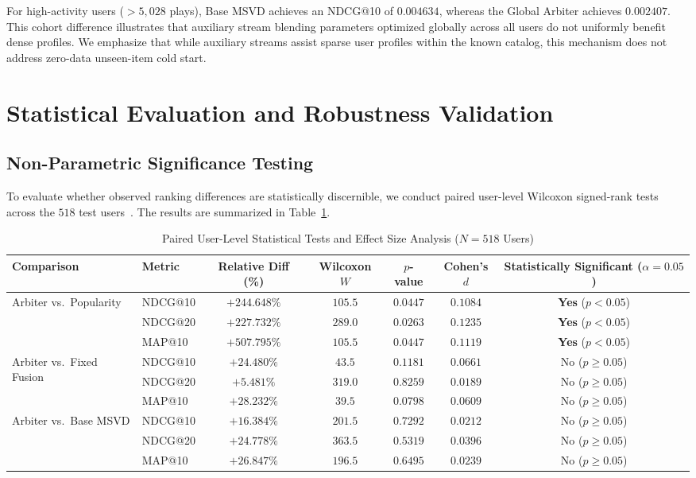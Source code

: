 \documentclass[conference]{IEEEtran}
\begin{document}
For high-activity users ($>5,028$ plays), Base MSVD achieves an NDCG@10 of $0.004634$, whereas the Global Arbiter achieves $0.002407$. This cohort difference illustrates that auxiliary stream blending parameters optimized globally across all users do not uniformly benefit dense profiles. We emphasize that while auxiliary streams assist sparse user profiles within the known catalog, this mechanism does not address zero-data unseen-item cold start.

\section{Statistical Evaluation and Robustness Validation}

\subsection{Non-Parametric Significance Testing}
To evaluate whether observed ranking differences are statistically discernible, we conduct paired user-level Wilcoxon signed-rank tests across the $518$ test users~\cite{wilcoxon1945individual}. The results are summarized in Table~\ref{tab:significance}.

\begin{table}[t]
\caption{Paired User-Level Statistical Tests and Effect Size Analysis ($N = 518$ Users)}
\label{tab:significance}
\centering
\begin{tabular}{llccccc}
\toprule
\textbf{Comparison} & \textbf{Metric} & \textbf{Relative Diff (\%)} & \textbf{Wilcoxon $W$} & \textbf{$p$-value} & \textbf{Cohen's $d$} & \textbf{Statistically Significant ($\alpha=0.05$)} \\
\midrule
\multirow{3}{*}{Arbiter vs.\ Popularity} & NDCG@10 & $+244.648\%$ & $105.5$ & $\mathbf{0.0447}$ & $0.1084$ & \textbf{Yes} ($p < 0.05$) \\
& NDCG@20 & $+227.732\%$ & $289.0$ & $\mathbf{0.0263}$ & $0.1235$ & \textbf{Yes} ($p < 0.05$) \\
& MAP@10 & $+507.795\%$ & $105.5$ & $\mathbf{0.0447}$ & $0.1119$ & \textbf{Yes} ($p < 0.05$) \\
\midrule
\multirow{3}{*}{Arbiter vs.\ Fixed Fusion} & NDCG@10 & $+24.480\%$ & $43.5$ & $0.1181$ & $0.0661$ & No ($p \ge 0.05$) \\
& NDCG@20 & $+5.481\%$ & $319.0$ & $0.8259$ & $0.0189$ & No ($p \ge 0.05$) \\
& MAP@10 & $+28.232\%$ & $39.5$ & $0.0798$ & $0.0609$ & No ($p \ge 0.05$) \\
\midrule
\multirow{3}{*}{Arbiter vs.\ Base MSVD} & NDCG@10 & $+16.384\%$ & $201.5$ & $0.7292$ & $0.0212$ & No ($p \ge 0.05$) \\
& NDCG@20 & $+24.778\%$ & $363.5$ & $0.5319$ & $0.0396$ & No ($p \ge 0.05$) \\
& MAP@10 & $+26.847\%$ & $196.5$ & $0.6495$ & $0.0239$ & No ($p \ge 0.05$) \\
\bottomrule
\end{tabular}
\end{table}
\end{document}
